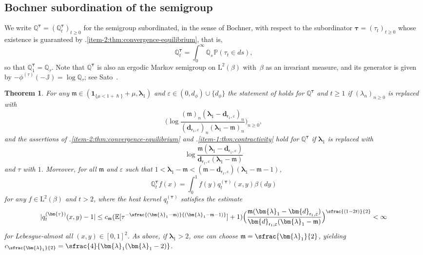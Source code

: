 \documentclass[JEP,XML,SOM,Unicode]{cedram}
\let\epsilon\varepsilon
\newcommand{\psfrac}[2]{\sfrac{(#1)}{#2}}
\newcommand{\pspfrac}[2]{\sfrac{(#1)}{(#2)}}
\theoremstyle{plain}
\newtheorem{theorem}{Theorem}[section]
\theoremstyle{definition}
\newcommand{\E}{\mathbb{E}}
\newcommand{\Prob}{\mathbb{P}}
\newcommand{\J}{\mathds{Q}}
\newcommand{\calJ}{\mathds{J}}
\newcommand{\Leb}{\mathrm{L}}
\newcommand{\m}{\mathfrak{m}}
\newcommand{\dpt}{\bm{d}_{\vat,\epsilon}}
\newcommand{\lam}{{\bm{\lambda}_1}}
\newcommand{\vat}{{\mathsf{r}_1}}
\let\h\hslash
\let\mo\mu
\let\bpsi\beta
\begin{document}
\subsection{Bochner subordination of the semigroup}

We write $\J^{\bm{\tau}} = (\J_t^{\bm{\tau}})_{t \geq 0}$ for the semigroup subordinated, in the sense of Bochner, with respect to the subordinator ${\bm{\tau}} = (\tau_t)_{t \geq 0}$ whose existence is guaranteed by .\eqref{item-2:thm:convergence-equilibrium}, that is,
\begin{equation*}
\J_t^{\bm{\tau}} = \int_0^\infty \J_s \hspace{1pt} \Prob(\tau_t \in ds),
\end{equation*}
so that $\J_1^{\bm{\tau}} = \J_\tau$. Note that $ \J^{\bm{\tau}}$ is also an ergodic Markov semigroup on $\Leb^2(\bpsi)$ with~$\bpsi$ as an invariant measure, and its generator is given by $-\phi^{(\tau)}(-\calJ) = \log \J_\tau$; see Sato~\cite[Chap.\,6]{Sato1999}.

\begin{theorem}
\label{cor:subordinated}
For any $\m \in (\bm{1}_{\{\mo < 1+\h\}} + \mo , \lam)$ and $\epsilon \in (0,d_\phi) \cup \{d_\phi\}$ the statement of  holds for $\J^{\bm{\tau}}$ and $t \ge 1$
if $(\lambda_n)_{n \geq 0}$ is replaced with
\[
\biggl(\log \frac{(\m)_n(\lam-\dpt)_n}{(\dpt)_n(\lam-\m)_n}\biggr)_{n \geq 0},
\]
and the assertions of .\eqref{item-2:thm:convergence-equilibrium} and .\eqref{item-1:thm:contractivity} hold for $\J^{\bm{\tau}}$ if $\lam$ is replaced with
\[
\log \frac{\m(\lam-\dpt)}{\dpt(\lam-\m)}
\]
and $\tau$ with $1$. Moreover, for all $\m$ and $\epsilon$ such that $1 < \lam - \m < (\m - \dpt)(\lam-\m-1)$,
\[
\J_t^{\bm{\tau}} f (x) = \int_0^1 f(y) q_t^{(\bm{\tau})}(x,y) \bpsi(dy)
\]
for any $f\in \Leb^2(\bpsi)$ and $t > 2$, where the heat kernel $q_t^{(\bm{\tau})}$ satisfies the estimate
\begin{equation*}
|q_t^{(\bm{\tau})}(x,y) - 1| \leq c_\m(\E[\tau^{-\pspfrac{\lam-\m}{\lam-\m-1}}]+1) \Bigl(\frac{\m(\lam-\dpt)}{\dpt(\lam-\m)}\Bigr)^{\psfrac{1-2t}{2}} < \infty
\end{equation*}
for Lebesgue-almost all $(x,y) \in [0,1]^2$. As above, if $\lam> 2$, one can choose $\m=\sfrac{\lam}{2}$, yielding $c_{\sfrac{\lam}{2}}=\sfrac{4}{\lam(\lam- 2)}$.
\end{theorem}
\end{document}
